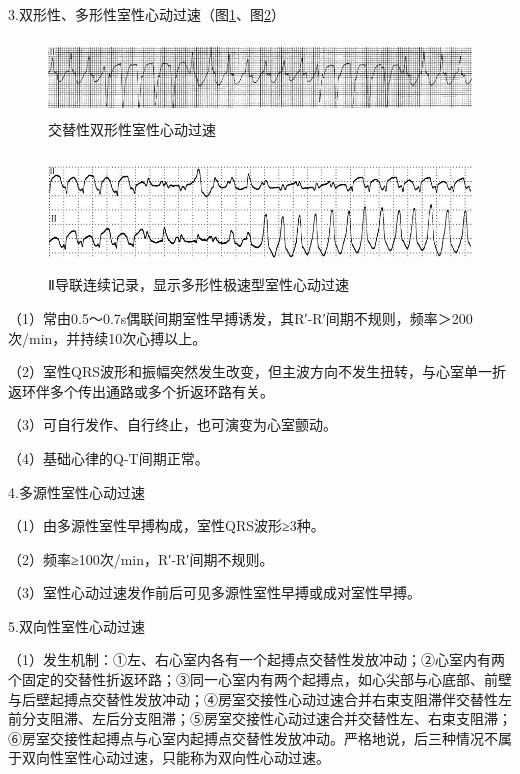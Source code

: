 3.双形性、多形性室性心动过速（图\ref{fig33-6}、图\ref{fig33-7}）

\begin{figure}[!htbp]
 \centering
 \includegraphics[width=5.58333in,height=0.80208in]{./images/Image00535.jpg}
 \captionsetup{justification=centering}
 \caption{交替性双形性室性心动过速}
 \label{fig33-6}
  \end{figure} 

\begin{figure}[!htbp]
 \centering
 \includegraphics[width=5.625in,height=1.21875in]{./images/Image00536.jpg}
 \captionsetup{justification=centering}
 \caption{Ⅱ导联连续记录，显示多形性极速型室性心动过速}
 \label{fig33-7}
  \end{figure} 

（1）常由0.5～0.7s偶联间期室性早搏诱发，其R′-R′间期不规则，频率＞200次/min，并持续10次心搏以上。

（2）室性QRS波形和振幅突然发生改变，但主波方向不发生扭转，与心室单一折返环伴多个传出通路或多个折返环路有关。

（3）可自行发作、自行终止，也可演变为心室颤动。

（4）基础心律的Q-T间期正常。

4.多源性室性心动过速

（1）由多源性室性早搏构成，室性QRS波形≥3种。

（2）频率≥100次/min，R′-R′间期不规则。

（3）室性心动过速发作前后可见多源性室性早搏或成对室性早搏。

5.双向性室性心动过速

（1）发生机制：①左、右心室内各有一个起搏点交替性发放冲动；②心室内有两个固定的交替性折返环路；③同一心室内有两个起搏点，如心尖部与心底部、前壁与后壁起搏点交替性发放冲动；④房室交接性心动过速合并右束支阻滞伴交替性左前分支阻滞、左后分支阻滞；⑤房室交接性心动过速合并交替性左、右束支阻滞；⑥房室交接性起搏点与心室内起搏点交替性发放冲动。严格地说，后三种情况不属于双向性室性心动过速，只能称为双向性心动过速。

